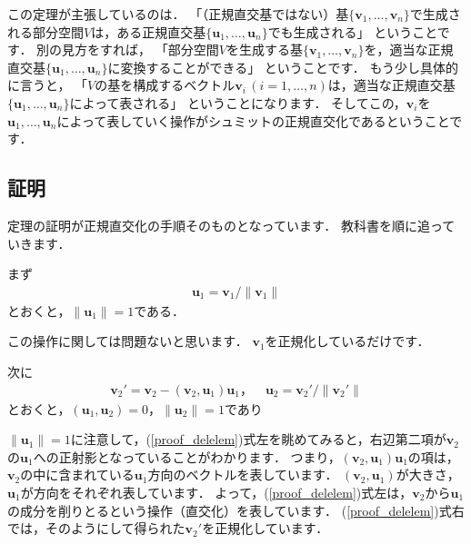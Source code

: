 \documentclass[dvipdfmx]{jsarticle}
\theoremstyle{definition}
\begin{document}
この定理が主張しているのは．
「（正規直交基ではない）基$\{\bm{v}_1, \ldots, \bm{v}_n\}$で生成される部分空間$V$は，ある正規直交基$\{\bm{u}_1, \ldots, \bm{u}_n\}$でも生成される」
ということです．
別の見方をすれば，
「部分空間$V$を生成する基$\{\bm{v}_1, \ldots, \bm{v}_n\}$を，適当な正規直交基$\{\bm{u}_1, \ldots, \bm{u}_n\}$に変換することができる」
ということです．
もう少し具体的に言うと，
「$V$の基を構成するベクトル$\bm{v}_i \, (i = 1, \ldots, n)$は，適当な正規直交基$\{\bm{u}_1, \ldots, \bm{u}_n\}$によって表される」
ということになります．
そしてこの，$\bm{v}_i$を$\bm{u}_1, \ldots, \bm{u}_n$によって表していく操作がシュミットの正規直交化であるということです．


\subsection{証明}
定理の証明が正規直交化の手順そのものとなっています．
教科書を順に追っていきます．
\begin{leftbar}
    まず
    \begin{align*}
        \bm{u}_1 = \bm{v}_1 / \|\bm{v}_1\|
    \end{align*}
    とおくと，$\|\bm{u}_1\| = 1$である．
\end{leftbar}
この操作に関しては問題ないと思います．
$\bm{v}_1$を正規化しているだけです．

\begin{leftbar}
    次に
    \begin{align}
        \bm{v}_2' = \bm{v}_2 - (\bm{v}_2, \bm{u}_1)\bm{u}_1，\quad \bm{u}_2 = \bm{v}_2' / \|\bm{v}_2'\|
        \label{proof_delelem}
    \end{align}
    とおくと，$(\bm{u}_1, \bm{u}_2) = 0$，$\|\bm{u}_2\| = 1$であり
\end{leftbar}

$\| \bm{u}_1 \| = 1$に注意して，(\ref{proof_delelem})式左を眺めてみると，右辺第二項が$\bm{v}_2$の$\bm{u}_1$への正射影となっていることがわかります．
つまり，$(\bm{v}_2, \bm{u}_1) \bm{u}_1$の項は，$\bm{v}_2$の中に含まれている$\bm{u}_1$方向のベクトルを表しています．
$(\bm{v}_2, \bm{u}_1)$が大きさ，$\bm{u}_1$が方向をそれぞれ表しています．
よって，(\ref{proof_delelem})式左は，$\bm{v}_2$から$\bm{u}_1$の成分を削りとるという操作（直交化）を表しています．
(\ref{proof_delelem})式右では，そのようにして得られた$\bm{v}_2'$を正規化しています．
\end{document}
